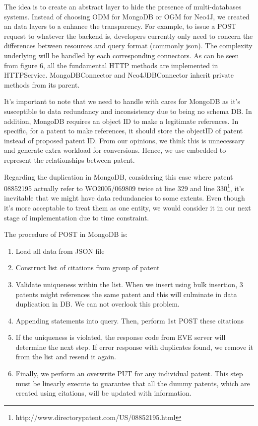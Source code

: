 \documentclass{sig-alternate}
\begin{document}
{The idea is to create an abstract layer to hide the presence of multi-databases systems. Instead of choosing ODM for MongoDB or OGM for Neo4J, we created an data layers to a enhance the transparency. For example, to issue a POST request to whatever the backend is, developers currently only need to concern the differences between resources and query format (commonly json). The complexity underlying will be handled by each corresponding connectors. As can be seen from figure 6, all the fundamental HTTP methods are implemented in HTTPService. MongoDBConnector and Neo4JDBConnector inherit private methods from its parent. 

It's important to note that we need to handle with cares for MongoDB as it's susceptible to data redundancy and inconsistency due to being no schema DB. In addition, MongoDB requires an object ID to make a legitimate references. In specific, for a patent to make references, it should store the objectID of patent instead of proposed patent ID. From our opinions, we think this is unnecessary and generate extra workload for conversions. Hence, we use embedded to represent the relationships between patent. 

Regarding the duplication in MongoDB, considering this case where patent 08852195 actually refer to WO2005/069809 twice at line 329 and line 330\footnote{http://www.directorypatent.com/US/08852195.html}, it's inevitable that we might have data redundancies to some extents. Even though it's more acceptable to treat them as one entity, we would consider it in our next stage of implementation due to time constraint.

The procedure of POST in MongoDB is:
\begin{enumerate}
 \item Load all data from JSON file
 \item Construct list of citations from group of patent
 \item Validate uniqueness within the list. When we insert using bulk insertion, 3 patents might references the same patent and this will culminate in data duplication in DB. We can not overlook this problem.
 \item Appending statements into query. Then, perform 1st POST these citations 
 \item If the uniqueness is violated, the response code from EVE server will determine the next step. If error response with duplicates found, we remove it from the list and resend it again.
 \item Finally, we perform an overwrite PUT for any individual patent. This step must be linearly execute to guarantee that all the dummy patents, which are created using citations, will be updated with information.
\end{enumerate}

}
\end{document}
